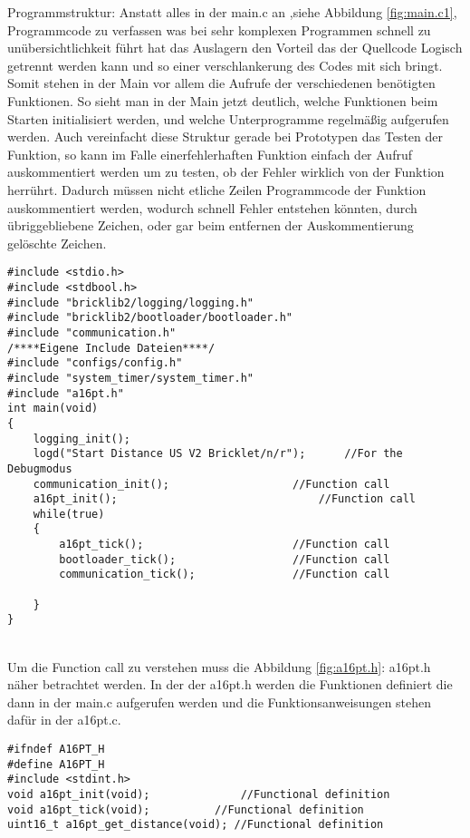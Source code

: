 Programmstruktur:
Anstatt alles in der main.c an ,siehe Abbildung \ref{fig:main.c1}, Programmcode zu verfassen was bei sehr komplexen Programmen schnell zu unübersichtlichkeit führt hat das Auslagern den Vorteil das der Quellcode Logisch getrennt werden kann und so einer verschlankerung des Codes mit sich bringt. 
Somit stehen in der Main  vor allem die Aufrufe der verschiedenen benötigten Funktionen. So sieht man in der Main jetzt deutlich, welche Funktionen beim Starten initialisiert werden, und welche Unterprogramme regelmäßig aufgerufen werden. Auch vereinfacht diese Struktur gerade bei Prototypen das Testen der Funktion, so kann im Falle einerfehlerhaften Funktion einfach der Aufruf auskommentiert werden um zu testen, ob der Fehler wirklich von der Funktion herrührt. Dadurch müssen nicht etliche Zeilen Programmcode der Funktion auskommentiert werden, wodurch schnell Fehler entstehen könnten, durch übriggebliebene Zeichen, oder gar beim entfernen der Auskommentierung gelöschte Zeichen.\\
\begin{minipage}{1\textwidth}
\begin{lstlisting}
#include <stdio.h>
#include <stdbool.h>
#include "bricklib2/logging/logging.h"
#include "bricklib2/bootloader/bootloader.h"
#include "communication.h"
/****Eigene Include Dateien****/
#include "configs/config.h"
#include "system_timer/system_timer.h"
#include "a16pt.h"
int main(void)
{ 
	logging_init(); 
	logd("Start Distance US V2 Bricklet/n/r");  	//For the Debugmodus
	communication_init(); 					//Function call
	a16pt_init(); 								//Function call	
	while(true)
	{
		a16pt_tick(); 						//Function call
		bootloader_tick(); 					//Function call
		communication_tick(); 				//Function call
		
	}
}
\end{lstlisting}
\label{fig:main.c1}
\end{minipage}\\
Um die Function call zu verstehen muss die Abbildung \ref{fig:a16pt.h}: a16pt.h näher betrachtet werden.
In der der a16pt.h werden die Funktionen definiert die dann in der main.c aufgerufen werden und die Funktionsanweisungen stehen dafür in der a16pt.c.\\
\begin{minipage}{1\textwidth}
\begin{lstlisting}
#ifndef A16PT_H
#define A16PT_H
#include <stdint.h>
void a16pt_init(void);				//Functional definition
void a16pt_tick(void); 			//Functional definition
uint16_t a16pt_get_distance(void); //Functional definition
\end{lstlisting}
\label{fig:a16pt.h}
\end{minipage}

